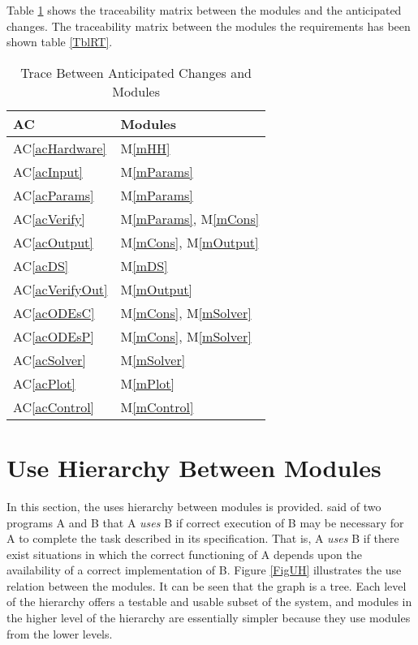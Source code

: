 \documentclass[12pt, titlepage]{article}
\newcommand{\acref}[1]{AC\ref{#1}}
\newcommand{\mref}[1]{M\ref{#1}}
\begin{document}
Table \ref{TblACT} shows the traceability matrix between the modules and the anticipated changes.
The traceability matrix between the modules the
requirements has been shown table \ref{TblRT}.



\begin{table}[H]
\centering
\begin{tabular}{p{} p{}}
\toprule
\textbf{AC} & \textbf{Modules}\\
\midrule
\acref{acHardware} & \mref{mHH}\\
\acref{acInput} & \mref{mParams}\\
\acref{acParams} &\mref{mParams}\\
\acref{acVerify} & \mref{mParams}, \mref{mCons}\\
\acref{acOutput} & \mref{mCons}, \mref{mOutput}\\
\acref{acDS} & \mref{mDS}\\
\acref{acVerifyOut} & \mref{mOutput}\\
\acref{acODEsC} & \mref{mCons}, \mref{mSolver}\\
\acref{acODEsP} &  \mref{mCons}, \mref{mSolver}\\
\acref{acSolver} & \mref{mSolver}\\
\acref{acPlot} & \mref{mPlot}\\
\acref{acControl} & \mref{mControl}\\
\bottomrule
\end{tabular}
\caption{Trace Between Anticipated Changes and Modules}
\label{TblACT}
\end{table}

\section{Use Hierarchy Between Modules} \label{SecUse}


In this section, the uses hierarchy between modules is provided. \cite{Parnas1978} said of two programs A and B that A {\em uses} B if correct execution of B may be necessary for A to complete the task described in its specification. That is, A {\em uses} B if there exist situations in which
the correct functioning of A depends upon the availability of a correct implementation of B.  Figure \ref{FigUH} illustrates the use relation between the modules. It can be seen that the graph is a tree. Each level of the hierarchy offers a testable and usable subset of the system, and modules in the higher level of the hierarchy are essentially simpler because they use modules from the lower levels.
\end{document}
